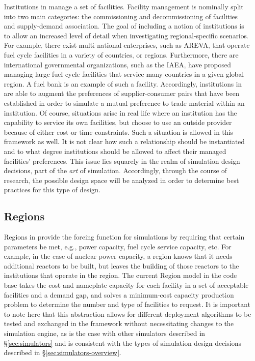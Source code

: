 Institutions in \Cyclus manage a set of facilities. Facility management is
nominally split into two main categories: the commissioning and decommissioning
of facilities and supply-demand association. The goal of including a notion of
institutions is to allow an increased level of detail when investigating
regional-specific scenarios. For example, there exist multi-national
enterprises, such as AREVA, that operate fuel cycle facilities in a variety of
countries, or regions. Furthermore, there are international governmental
organizations, such as the IAEA, have proposed managing large fuel cycle
facilities that service many countries in a given global region. A fuel bank is
an example of such a facility. Accordingly, institutions in \Cyclus are able to
augment the preferences of supplier-consumer pairs that have been established in
order to simulate a mutual preference to trade material within an
institution. Of course, situations arise in real life where an institution has
the capability to service its own facilities, but choose to use an outside
provider because of either cost or time constraints. Such a situation is allowed
in this framework as well. It is not clear how such a relationship should be
instantiated and to what degree institutions should be allowed to affect their
managed facilities' preferences. This issue lies squarely in the realm of
simulation design decisions, part of the \textit{art} of
simulation. Accordingly, through the course of research, the possible design
space will be analyzed in order to determine best practices for this type of
design.

\subsection{Regions}

Regions in \Cyclus provide the forcing function for simulations by requiring
that certain parameters be met, e.g., power capacity, fuel cycle service
capacity, etc. For example, in the case of nuclear power capacity, a region
knows that it needs additional reactors to be built, but leaves the building of
those reactors to the institutions that operate in the region. The current
Region model in the \Cyclus code base takes the cost and nameplate capacity for
each facility in a set of acceptable facilities and a demand gap, and solves a
minimum-cost capacity production problem to determine the number and type of
facilities to request. It is important to note here that this abstraction allows
for different deployment algorithms to be tested and exchanged in the \Cyclus
framework without necessitating changes to the simulation engine, as is the case
with other simulators described in \S\ref{sec:simulators} and is consistent with
the types of simulation design decisions described in
\S\ref{sec:simulators-overview}. 

